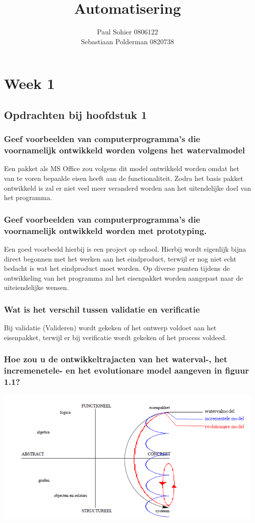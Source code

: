 \documentclass[a4paper,titlepage]{artikel1}
\author{Paul Sohier 0806122\\Sebastiaan Polderman 0820738}
\title{Automatisering}
\begin{document}
\maketitle
\tableofcontents
\newpage
 \section{Week 1}
  \subsection{Opdrachten bij hoofdstuk 1}
   \subsubsection[Opdracht 1]{Geef voorbeelden van computerprogramma's die voornamelijk ontwikkeld worden volgens het watervalmodel}
   Een pakket als MS Office zou volgens dit model ontwikkeld worden omdat het van te voren bepaalde eisen heeft aan de functionaliteit. 
   Zodra het basis pakket ontwikkeld is zal er niet veel meer veranderd worden aan het uitendelijke doel van het programma.
   
   \subsubsection[Opdracht 2]{Geef voorbeelden van computerprogramma's die voornamelijk ontwikkeld worden met prototyping.}
   Een goed voorbeeld hierbij is een project op school. Hierbij wordt eigenlijk bijna direct begonnen met het werken aan het eindproduct, terwijl er nog niet echt bedacht is wat het eindproduct moet worden. Op diverse punten tijdens de ontwikkeling van het programma zal het eisenpakket worden aangepast naar de uiteiendelijke wensen.
   
   \subsubsection[Opdracht 3]{Wat is het verschil tussen validatie en verificatie}
   Bij validatie (Valideren) wordt gekeken of het ontwerp voldoet aan het eisenpakket, terwijl er bij verificatie wordt gekeken of het process voldeed.
   
   \subsubsection[Opdracht 4]{Hoe zou u de ontwikkeltrajacten van het waterval-, het incremenetele- en het evolutionare model aangeven in figuur 1.1?}
   \includegraphics[scale=0.5]{H1O4.png}
   
\end{document}
